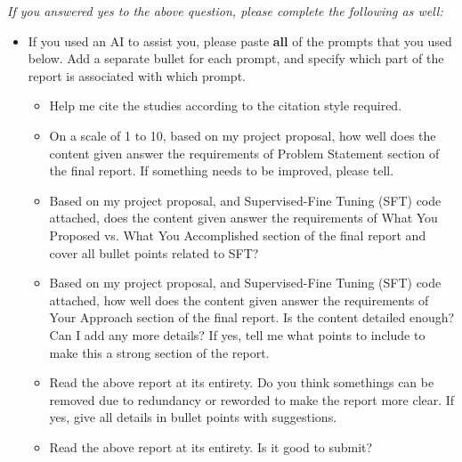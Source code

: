 \documentclass[11pt,a4paper]{article}
\begin{document}
\noindent\textit{If you answered yes to the above question, please complete the following as well:}

\begin{itemize}
    \item{If you used an AI to assist you, please paste \textbf{all} of the prompts that you used below. Add a separate bullet for each prompt, and specify which part of the report is associated with which prompt.}
    \begin{itemize}
        \item{Help me cite the studies according to the citation style required.}
        \item{On a scale of 1 to 10, based on my project proposal, how well does the content given answer the requirements of Problem Statement section of the final report. If something needs to be improved, please tell.}
        \item{Based on my project proposal, and Supervised-Fine Tuning (SFT) code attached, does the content given answer the requirements of What You Proposed vs. What You Accomplished section of the final report and cover all bullet points related to SFT?}
        \item{Based on my project proposal, and Supervised-Fine Tuning (SFT) code attached, how well does the content given answer the requirements of Your Approach section of the final report. Is the content detailed enough? Can I add any more details? If yes, tell me what points to include to make this a strong section of the report.}
        \item{Read the above report at its entirety. Do you think somethings can be removed due to redundancy or reworded to make the report more clear. If yes, give all details in bullet points with suggestions.}
        \item{Read the above report at its entirety. Is it good to submit?}
    \end{itemize}
    

\end{itemize}
\end{document}
